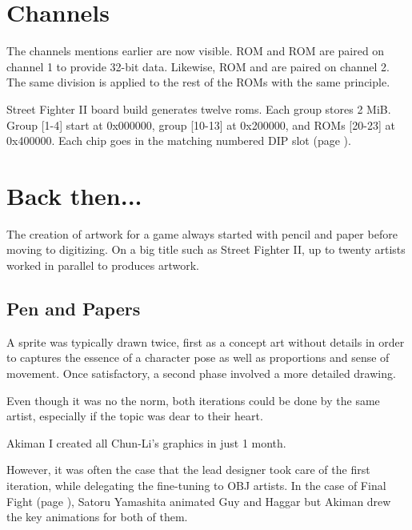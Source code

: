 
\section{Channels}\label{channels}
The channels mentions earlier are now visible. ROM  and ROM  are paired on channel 1 to provide 32-bit data. Likewise, ROM  and  are paired on channel 2. The same division is applied to the rest of the ROMs with the same principle. 


Street Fighter II board build generates twelve roms. Each group stores 2 MiB. Group [1-4] start at 0x000000, group [10-13] at 0x200000, and ROMs [20-23] at 0x400000. Each chip goes in the matching numbered DIP slot (page \pageref{boardb_no_chips}).










\section{Back then...}
The creation of artwork for a game always started with pencil and paper before moving to digitizing. On a big title such as Street Fighter II, up to twenty artists worked in parallel to produces artwork.

\subsection{Pen and Papers}
A sprite was typically drawn twice, first as a concept art without details in order to captures the essence of a character pose as well as proportions and sense of movement. Once satisfactory, a second phase involved a more detailed drawing.

Even though it was no the norm, both iterations could be done by the same artist, especially if the topic was dear to their heart.

\begin{q}{Akiman}
I created all Chun-Li’s graphics in just 1 month.
\end{q}

However, it was often the case that the lead designer took care of the first iteration, while delegating the fine-tuning to OBJ artists. In the case of Final Fight (page \pageref{ff_design}), Satoru Yamashita animated Guy and Haggar but Akiman drew the key animations for both of them.




